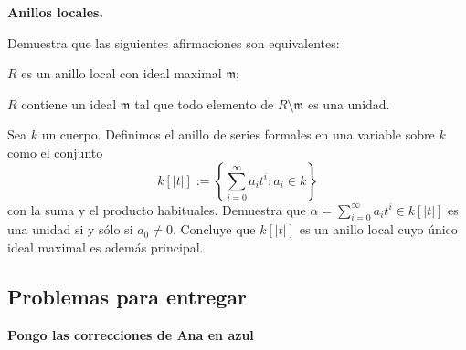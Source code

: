 \begin{problem}
{\bfseries Anillos locales.}

Demuestra que las siguientes afirmaciones son equivalentes:

\ppart $R$ es un anillo local con ideal maximal $\mathfrak m$;

\ppart $R$ contiene un ideal  $\mathfrak m$ tal que todo elemento de $R\setminus \mathfrak m$ es una unidad.
\solution
\end{problem}

\begin{problem}
Sea $k$ un cuerpo. Definimos el anillo de series formales en una variable sobre $k$ como el conjunto
$$k[|t|]:=\left\{\sum_{i=0}^{\infty}a_it^i: a_i\in k\right\}$$
con la suma y el producto habituales. Demuestra que $\alpha=\sum_{i=0}^{\infty}a_it^i
  \in k[|t|] $ es una unidad si y sólo si $a_0\neq 0$. Concluye que $k[|t|]$ es un anillo local cuyo único ideal maximal es además  principal.
\solution
\end{problem}

\subsection{Problemas para entregar}

\textbf{Pongo las correcciones de Ana en azul}

